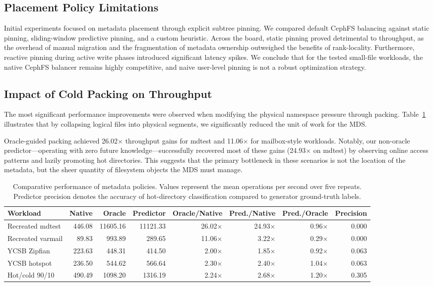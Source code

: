 \documentclass[letterpaper,twocolumn,10pt]{article}
\begin{document}
\subsection{Placement Policy Limitations}
Initial experiments focused on metadata placement through explicit subtree pinning. We compared default CephFS balancing against static pinning, sliding-window predictive pinning, and a custom heuristic. Across the board, static pinning proved detrimental to throughput, as the overhead of manual migration and the fragmentation of metadata ownership outweighed the benefits of rank-locality. Furthermore, reactive pinning during active write phases introduced significant latency spikes. We conclude that for the tested small-file workloads, the native CephFS balancer remains highly competitive, and naive user-level pinning is not a robust optimization strategy.

\subsection{Impact of Cold Packing on Throughput}
The most significant performance improvements were observed when modifying the physical namespace pressure through packing. Table~\ref{tab:paperready} illustrates that by collapsing logical files into physical segments, we significantly reduced the unit of work for the MDS. 

Oracle-guided packing achieved 26.02$\times$ throughput gains for mdtest and 11.06$\times$ for mailbox-style workloads. Notably, our non-oracle predictor—operating with zero future knowledge—successfully recovered most of these gains (24.93$\times$ on mdtest) by observing online access patterns and lazily promoting hot directories. This suggests that the primary bottleneck in these scenarios is not the location of the metadata, but the sheer quantity of filesystem objects the MDS must manage.

\begin{table}[t]
\centering
\small
\begin{tabular}{lrrrrrrr}
\toprule
Workload & Native & Oracle & Predictor & Oracle/Native & Pred./Native & Pred./Oracle & Precision \\
\midrule
Recreated mdtest & 446.08 & 11605.16 & 11121.33 & 26.02$\times$ & 24.93$\times$ & 0.96$\times$ & 0.000 \\
Recreated varmail & 89.83 & 993.89 & 289.65 & 11.06$\times$ & 3.22$\times$ & 0.29$\times$ & 0.000 \\
YCSB Zipfian & 223.63 & 448.31 & 414.50 & 2.00$\times$ & 1.85$\times$ & 0.92$\times$ & 0.063 \\
YCSB hotspot & 236.50 & 544.62 & 566.64 & 2.30$\times$ & 2.40$\times$ & 1.04$\times$ & 0.063 \\
Hot/cold 90/10 & 490.49 & 1098.20 & 1316.19 & 2.24$\times$ & 2.68$\times$ & 1.20$\times$ & 0.305 \\
\bottomrule
\end{tabular}
\caption{Comparative performance of metadata policies. Values represent the mean operations per second over five repeats. Predictor precision denotes the accuracy of hot-directory classification compared to generator ground-truth labels.}
\label{tab:paperready}
\end{table}
\end{document}

